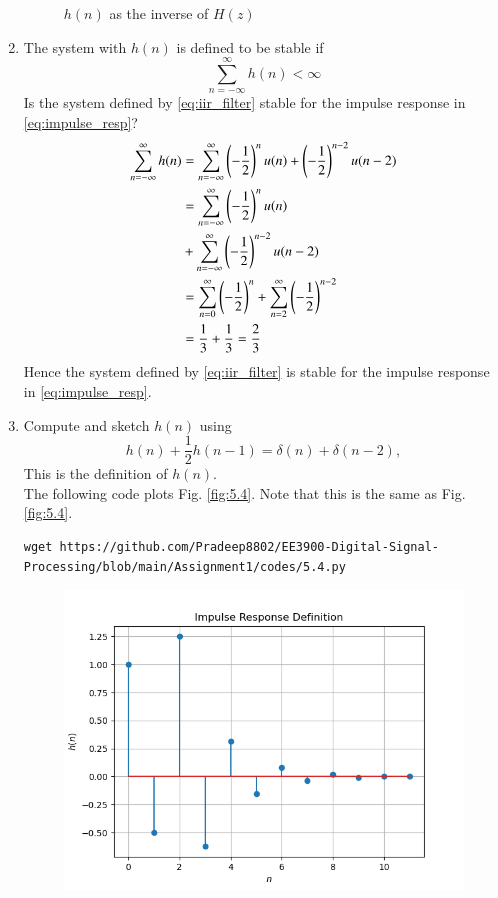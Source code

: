 \documentclass[journal,12pt,twocolumn]{IEEEtran}
\renewcommand\thesection{\arabic{section}}
\begin{document}
\begin{enumerate}[label=\thesection.\arabic*]
\begin{figure}[!ht]
\caption{$h(n)$ as the inverse of $H(z)$}
\label{fig:5.2}
\end{figure}
%
\item The system with $h(n)$ is defined to be stable if
\begin{equation}
\sum_{n=-\infty}^{\infty}h(n) < \infty
\end{equation}
Is the system defined by \eqref{eq:iir_filter} stable for the impulse response in \eqref{eq:impulse_resp}?\\
\solution 
\begin{align}
\sum_{n=-\infty}^{\infty} h(n) &= \sum_{n=-\infty}^{\infty} \left(-\frac{1}{2}\right)^{n}u(n) + \left(-\frac{1}{2}\right)^{n-2}u(n-2)\\
&= \sum_{n=-\infty}^{\infty} \left(-\frac{1}{2}\right)^{n}u(n) \\
&+\sum_{n=-\infty}^{\infty}  \left(-\frac{1}{2}\right)^{n-2}u(n-2)\\
&= \sum_{n=0}^{\infty} \left(-\frac{1}{2}\right)^{n} +
\sum_{n=2}^{\infty}  \left(-\frac{1}{2}\right)^{n-2}\\
&= \frac{1}{3}+\frac{1}{3}=\frac{2}{3}	
\end{align}
Hence the system defined by \eqref{eq:iir_filter} is stable for the impulse response in \eqref{eq:impulse_resp}.
%
\item 
Compute and sketch $h(n)$ using 
\begin{equation}
\label{eq:iir_filter_h}
h(n) + \frac{1}{2}h(n-1) = \delta(n) + \delta(n-2), 
\end{equation}
%
This is the definition of $h(n)$.
\\
\solution The following code plots Fig. \ref{fig:5.4}. Note that this is the same as Fig. 
\ref{fig:5.4}. 
%
\begin{lstlisting}
wget https://github.com/Pradeep8802/EE3900-Digital-Signal-Processing/blob/main/Assignment1/codes/5.4.py
\end{lstlisting}
\begin{figure}[!ht]
\centering
\includegraphics[width=\columnwidth]{./figs/5.4}

\end{figure}
\end{enumerate}
\end{document}
